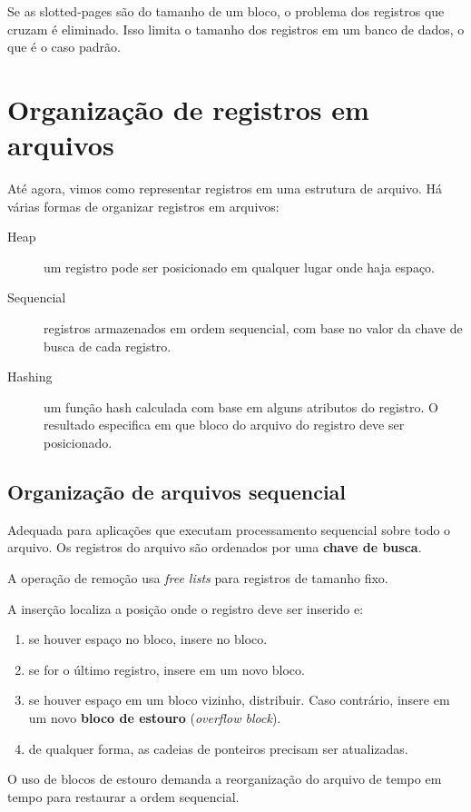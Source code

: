 Se as slotted-pages são do tamanho de um bloco, o problema dos registros que cruzam é eliminado.
Isso limita o tamanho dos registros em um banco de dados, o que é o caso padrão.

\section{Organização de registros em arquivos}

Até agora, vimos como representar registros em uma estrutura de arquivo.
Há várias formas de organizar registros em arquivos:
\begin{description}
\item[Heap] um registro pode ser posicionado em qualquer lugar onde haja espaço.

\item[Sequencial] registros armazenados em ordem sequencial, com base
no valor da chave de busca de cada registro.

\item[Hashing] um função hash calculada com base em alguns atributos do 
registro. O resultado especifica em que bloco do arquivo do registro
deve ser posicionado.
\end{description}

\subsection{Organização de arquivos sequencial}

Adequada para aplicações que executam processamento sequencial sobre todo o arquivo.
Os registros do arquivo são ordenados por uma \textbf{chave de busca}.

A operação de remoção usa \emph{free lists} para registros de tamanho fixo.

A inserção localiza a posição onde o registro deve ser inserido e:
\begin{enumerate}
\item se houver espaço no bloco, insere no bloco.
\item se for o último registro, insere em um novo bloco.
\item se houver espaço em um bloco vizinho, distribuir. Caso contrário,
insere em um novo \textbf{bloco de estouro} (\emph{overflow block}).
\item de qualquer forma, as cadeias de ponteiros precisam ser atualizadas.
\end{enumerate}
O uso de blocos de estouro demanda a reorganização do arquivo de tempo em tempo
para restaurar a ordem sequencial.

